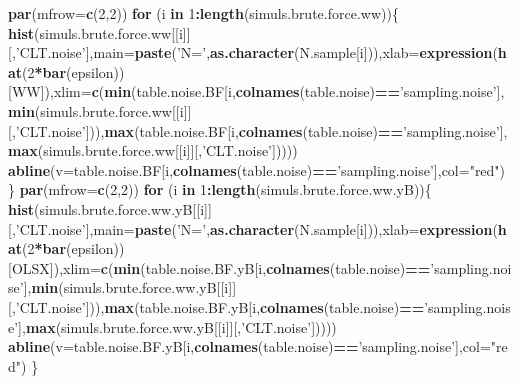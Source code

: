 \documentclass[]{book}
\newenvironment{Shaded}{\begin{snugshade}}{\end{snugshade}}
\newcommand{\KeywordTok}[1]{\textcolor[rgb]{0.13,0.29,0.53}{\textbf{#1}}}
\newcommand{\DataTypeTok}[1]{\textcolor[rgb]{0.13,0.29,0.53}{#1}}
\newcommand{\DecValTok}[1]{\textcolor[rgb]{0.00,0.00,0.81}{#1}}
\newcommand{\StringTok}[1]{\textcolor[rgb]{0.31,0.60,0.02}{#1}}
\newcommand{\ControlFlowTok}[1]{\textcolor[rgb]{0.13,0.29,0.53}{\textbf{#1}}}
\newcommand{\OperatorTok}[1]{\textcolor[rgb]{0.81,0.36,0.00}{\textbf{#1}}}
\newcommand{\NormalTok}[1]{#1}
\theoremstyle{definition}
\theoremstyle{definition}
\theoremstyle{definition}
\theoremstyle{remark}
\begin{document}
\begin{Shaded}
\begin{Highlighting}[]
\KeywordTok{par}\NormalTok{(}\DataTypeTok{mfrow=}\KeywordTok{c}\NormalTok{(}\DecValTok{2}\NormalTok{,}\DecValTok{2}\NormalTok{))}
\ControlFlowTok{for}\NormalTok{ (i }\ControlFlowTok{in} \DecValTok{1}\OperatorTok{:}\KeywordTok{length}\NormalTok{(simuls.brute.force.ww))\{}
  \KeywordTok{hist}\NormalTok{(simuls.brute.force.ww[[i]][,}\StringTok{'CLT.noise'}\NormalTok{],}\DataTypeTok{main=}\KeywordTok{paste}\NormalTok{(}\StringTok{'N='}\NormalTok{,}\KeywordTok{as.character}\NormalTok{(N.sample[i])),}\DataTypeTok{xlab=}\KeywordTok{expression}\NormalTok{(}\KeywordTok{hat}\NormalTok{(}\DecValTok{2}\OperatorTok{*}\KeywordTok{bar}\NormalTok{(epsilon))[WW]),}\DataTypeTok{xlim=}\KeywordTok{c}\NormalTok{(}\KeywordTok{min}\NormalTok{(table.noise.BF[i,}\KeywordTok{colnames}\NormalTok{(table.noise)}\OperatorTok{==}\StringTok{'sampling.noise'}\NormalTok{],}\KeywordTok{min}\NormalTok{(simuls.brute.force.ww[[i]][,}\StringTok{'CLT.noise'}\NormalTok{])),}\KeywordTok{max}\NormalTok{(table.noise.BF[i,}\KeywordTok{colnames}\NormalTok{(table.noise)}\OperatorTok{==}\StringTok{'sampling.noise'}\NormalTok{],}\KeywordTok{max}\NormalTok{(simuls.brute.force.ww[[i]][,}\StringTok{'CLT.noise'}\NormalTok{]))))}
  \KeywordTok{abline}\NormalTok{(}\DataTypeTok{v=}\NormalTok{table.noise.BF[i,}\KeywordTok{colnames}\NormalTok{(table.noise)}\OperatorTok{==}\StringTok{'sampling.noise'}\NormalTok{],}\DataTypeTok{col=}\StringTok{"red"}\NormalTok{)}
\NormalTok{\}}
\KeywordTok{par}\NormalTok{(}\DataTypeTok{mfrow=}\KeywordTok{c}\NormalTok{(}\DecValTok{2}\NormalTok{,}\DecValTok{2}\NormalTok{))}
\ControlFlowTok{for}\NormalTok{ (i }\ControlFlowTok{in} \DecValTok{1}\OperatorTok{:}\KeywordTok{length}\NormalTok{(simuls.brute.force.ww.yB))\{}
  \KeywordTok{hist}\NormalTok{(simuls.brute.force.ww.yB[[i]][,}\StringTok{'CLT.noise'}\NormalTok{],}\DataTypeTok{main=}\KeywordTok{paste}\NormalTok{(}\StringTok{'N='}\NormalTok{,}\KeywordTok{as.character}\NormalTok{(N.sample[i])),}\DataTypeTok{xlab=}\KeywordTok{expression}\NormalTok{(}\KeywordTok{hat}\NormalTok{(}\DecValTok{2}\OperatorTok{*}\KeywordTok{bar}\NormalTok{(epsilon))[OLSX]),}\DataTypeTok{xlim=}\KeywordTok{c}\NormalTok{(}\KeywordTok{min}\NormalTok{(table.noise.BF.yB[i,}\KeywordTok{colnames}\NormalTok{(table.noise)}\OperatorTok{==}\StringTok{'sampling.noise'}\NormalTok{],}\KeywordTok{min}\NormalTok{(simuls.brute.force.ww.yB[[i]][,}\StringTok{'CLT.noise'}\NormalTok{])),}\KeywordTok{max}\NormalTok{(table.noise.BF.yB[i,}\KeywordTok{colnames}\NormalTok{(table.noise)}\OperatorTok{==}\StringTok{'sampling.noise'}\NormalTok{],}\KeywordTok{max}\NormalTok{(simuls.brute.force.ww.yB[[i]][,}\StringTok{'CLT.noise'}\NormalTok{]))))}
  \KeywordTok{abline}\NormalTok{(}\DataTypeTok{v=}\NormalTok{table.noise.BF.yB[i,}\KeywordTok{colnames}\NormalTok{(table.noise)}\OperatorTok{==}\StringTok{'sampling.noise'}\NormalTok{],}\DataTypeTok{col=}\StringTok{"red"}\NormalTok{)}
\NormalTok{\}}
\end{Highlighting}
\end{Shaded}
\end{document}
